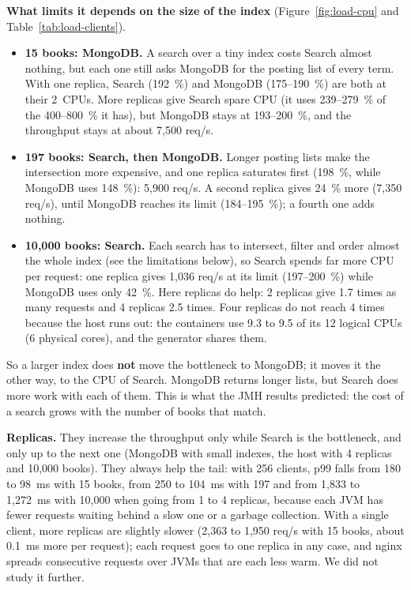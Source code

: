 \textbf{What limits it depends on the size of the index} (Figure~\ref{fig:load-cpu} and Table~\ref{tab:load-clients}).
\begin{itemize}
  \item \textbf{15 books: MongoDB.} A search over a tiny index costs Search almost nothing, but each one still asks
        MongoDB for the posting list of every term. With one replica, Search (192~\%) and MongoDB (175--190~\%) are
        both at their 2~CPUs. More replicas give Search spare CPU (it uses 239--279~\% of the 400--800~\% it has),
        but MongoDB stays at 193--200~\%, and the throughput stays at about 7,500 req/s.
  \item \textbf{197 books: Search, then MongoDB.} Longer posting lists make the intersection more expensive, and one
        replica saturates first (198~\%, while MongoDB uses 148~\%): 5,900 req/s. A second replica gives 24~\% more
        (7,350 req/s), until MongoDB reaches its limit (184--195~\%); a fourth one adds nothing.
  \item \textbf{10,000 books: Search.} Each search has to intersect, filter and order almost the whole index (see the
        limitations below), so Search spends far more CPU per request: one replica gives 1,036 req/s at its limit
        (197--200~\%) while MongoDB uses only 42~\%. Here replicas do help: 2 replicas give 1.7 times as many requests
        and 4 replicas 2.5 times. Four replicas do not reach 4 times because the host runs out: the containers use 9.3
        to 9.5 of its 12 logical CPUs (6 physical cores), and the generator shares them.
\end{itemize}
So a larger index does \textbf{not} move the bottleneck to MongoDB; it moves it the other way, to the CPU of Search.
MongoDB returns longer lists, but Search does more work with each of them. This is what the JMH results predicted:
the cost of a search grows with the number of books that match.

\textbf{Replicas.} They increase the throughput only while Search is the bottleneck, and only up to the next one
(MongoDB with small indexes, the host with 4 replicas and 10,000 books). They always help the tail: with 256 clients,
p99 falls from 180 to 98~ms with 15 books, from 250 to 104~ms with 197 and from 1,833 to 1,272~ms with 10,000 when
going from 1 to 4 replicas, because each JVM has fewer requests waiting behind a slow one or a garbage collection.
With a single client, more replicas are slightly slower (2,363 to 1,950 req/s with 15 books, about 0.1~ms more per
request); each request goes to one replica in any case, and nginx spreads consecutive requests over JVMs that are each
less warm. We did not study it further.

